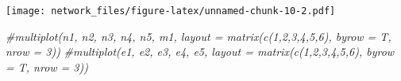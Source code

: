 \documentclass[]{article}
\newenvironment{Shaded}{\begin{snugshade}}{\end{snugshade}}
\newcommand{\CommentTok}[1]{\textcolor[rgb]{0.56,0.35,0.01}{\textit{{#1}}}}
\begin{document}
\texttt{[image: network\_files/figure-latex/unnamed-chunk-10-2.pdf]}

\begin{Shaded}
\begin{Highlighting}[]
\CommentTok{#multiplot(n1, n2, n3, n4, n5, m1, layout = matrix(c(1,2,3,4,5,6), byrow = T, nrow = 3))}
\CommentTok{#multiplot(e1, e2, e3, e4, e5, layout = matrix(c(1,2,3,4,5,6), byrow = T, nrow = 3))}
\end{Highlighting}
\end{Shaded}
\end{document}
